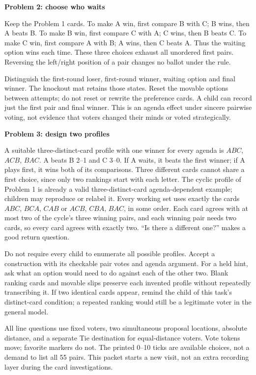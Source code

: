 \documentclass[11pt,letterpaper]{article}
\newcommand{\heading}[1]{\par\vspace{4pt}{\large\bfseries #1}\par}
\newcommand{\sub}[1]{\par\textbf{#1}\par}
\begin{document}
\sub{Problem 2: choose who waits}
Keep the Problem 1 cards. To make A win, first compare B with C; B wins, then A beats B. To make B win, first compare C with A; C wins, then B beats C. To make C win, first compare A with B; A wins, then C beats A. Thus the waiting option wins each time. These three choices exhaust all unordered first pairs. Reversing the left/right position of a pair changes no ballot under the rule.

Distinguish the first-round loser, first-round winner, waiting option and final winner. The knockout mat retains those states. Reset the movable options between attempts; do not reset or rewrite the preference cards. A child can record just the first pair and final winner. This is an agenda effect under sincere pairwise voting, not evidence that voters changed their minds or voted strategically.

\sub{Problem 3: design two profiles}
A suitable three-distinct-card profile with one winner for every agenda is $ABC$, $ACB$, $BAC$. A beats B 2--1 and C 3--0. If A waits, it beats the first winner; if A plays first, it wins both of its comparisons. Three different cards cannot share a first choice, since only two rankings start with each letter. The cyclic profile of Problem 1 is already a valid three-distinct-card agenda-dependent example; children may reproduce or relabel it. Every working set uses exactly the cards $ABC$, $BCA$, $CAB$ or $ACB$, $CBA$, $BAC$, in some order. Each card agrees with at most two of the cycle's three winning pairs, and each winning pair needs two cards, so every card agrees with exactly two. ``Is there a different one?'' makes a good return question.

Do not require every child to enumerate all possible profiles. Accept a construction with its checkable pair votes and agenda argument. For a held hint, ask what an option would need to do against each of the other two. Blank ranking cards and movable slips preserve each invented profile without repeatedly transcribing it. If two identical cards appear, remind the child of this task's distinct-card condition; a repeated ranking would still be a legitimate voter in the general model.
\newpage
\heading{Line packet: a winner among locations}
All line questions use fixed voters, two simultaneous proposal locations, absolute distance, and a separate Tie destination for equal-distance voters. Vote tokens move; favorite markers do not. The printed 0--10 ticks are available choices, not a demand to list all 55 pairs. This packet starts a new visit, not an extra recording layer during the card investigations.
\end{document}
